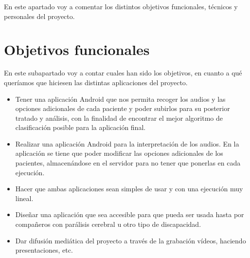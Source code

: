 
En este apartado voy a comentar los distintos objetivos funcionales, técnicos y personales del proyecto.

\section{Objetivos funcionales}
En este subapartado voy a contar cuales han sido los objetivos, en cuanto a qué queríamos que hiciesen las distintas aplicaciones del proyecto.
\begin{itemize}
	\item
	Tener una aplicación Android que nos permita recoger los audios y las opciones adicionales de cada paciente y poder subirlos para su posterior tratado y análisis, con la finalidad de encontrar el mejor algoritmo de clasificación posible para la aplicación final.
	\item
	Realizar una aplicación Android para la interpretación de los audios. En la aplicación se tiene que poder modificar las opciones adicionales de los pacientes, almacenándose en el servidor para no tener que ponerlas en cada ejecución.
	\item
	Hacer que ambas aplicaciones sean simples de usar y con una ejecución muy lineal.
	\item
	Diseñar una aplicación que sea accesible para que pueda ser usada hasta por compañeros con parálisis cerebral u otro tipo de discapacidad.
	\item
	Dar difusión mediática del proyecto a través de la grabación vídeos, haciendo presentaciones, etc.
\end{itemize}

